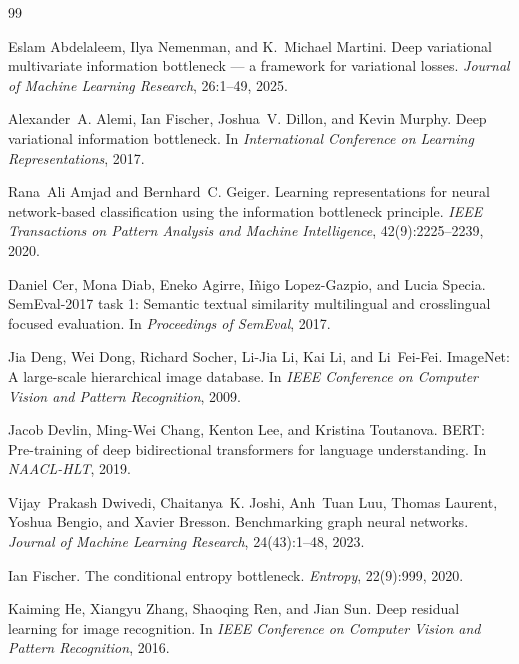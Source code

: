 \documentclass{article} %
\begin{document}

\begin{thebibliography}{99}

Eslam Abdelaleem, Ilya Nemenman, and K.~Michael Martini.
\newblock Deep variational multivariate information bottleneck --- a framework for
  variational losses.
\newblock \emph{Journal of Machine Learning Research}, 26:1--49, 2025.

Alexander~A. Alemi, Ian Fischer, Joshua~V. Dillon, and Kevin Murphy.
\newblock Deep variational information bottleneck.
\newblock In \emph{International Conference on Learning Representations}, 2017.

Rana~Ali Amjad and Bernhard~C. Geiger.
\newblock Learning representations for neural network-based classification using the
  information bottleneck principle.
\newblock \emph{IEEE Transactions on Pattern Analysis and Machine Intelligence},
  42(9):2225--2239, 2020.

Daniel Cer, Mona Diab, Eneko Agirre, I\~{n}igo Lopez-Gazpio, and Lucia Specia.
\newblock SemEval-2017 task 1: Semantic textual similarity multilingual and crosslingual
  focused evaluation.
\newblock In \emph{Proceedings of SemEval}, 2017.

Jia Deng, Wei Dong, Richard Socher, Li-Jia Li, Kai Li, and Li~Fei-Fei.
\newblock ImageNet: A large-scale hierarchical image database.
\newblock In \emph{IEEE Conference on Computer Vision and Pattern Recognition}, 2009.

Jacob Devlin, Ming-Wei Chang, Kenton Lee, and Kristina Toutanova.
\newblock BERT: Pre-training of deep bidirectional transformers for language
  understanding.
\newblock In \emph{NAACL-HLT}, 2019.

Vijay~Prakash Dwivedi, Chaitanya~K. Joshi, Anh~Tuan Luu, Thomas Laurent, Yoshua Bengio,
  and Xavier Bresson.
\newblock Benchmarking graph neural networks.
\newblock \emph{Journal of Machine Learning Research}, 24(43):1--48, 2023.

Ian Fischer.
\newblock The conditional entropy bottleneck.
\newblock \emph{Entropy}, 22(9):999, 2020.

Kaiming He, Xiangyu Zhang, Shaoqing Ren, and Jian Sun.
\newblock Deep residual learning for image recognition.
\newblock In \emph{IEEE Conference on Computer Vision and Pattern Recognition}, 2016.


\end{thebibliography}
\end{document}
